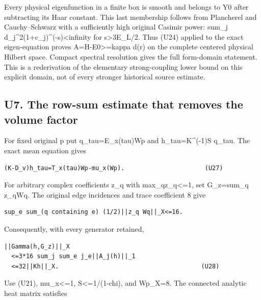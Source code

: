 \documentclass[11pt,a4paper]{article}
\renewcommand{\[}{\begingroup\small\originaldisplaystart}
\renewcommand{\]}{\originaldisplayend\endgroup}
\begin{document}
Every physical eigenfunction in a finite box is smooth and belongs to Y0
after subtracting its Haar constant. This last membership follows from
Plancherel and Cauchy--Schwarz with a sufficiently high original Casimir
power: sum\_j
{d\allowbreak{}\_\allowbreak{}j\allowbreak{}\textasciicircum{}\allowbreak{}2\allowbreak{}(\allowbreak{}1\allowbreak{}+\allowbreak{}c\allowbreak{}\_\allowbreak{}j\allowbreak{})\allowbreak{}\textasciicircum{}\allowbreak{}(\allowbreak{}-\allowbreak{}s\allowbreak{})\allowbreak{}\textless{}\allowbreak{}i\allowbreak{}n\allowbreak{}f\allowbreak{}i\allowbreak{}n\allowbreak{}i\allowbreak{}t\allowbreak{}y\allowbreak{}}
for s\textgreater3\textbar E\_L\textbar/2. Thus (U24) applied to the
exact eigen-equation proves A=H-E0\textgreater=kappa d(r) on the
complete centered physical Hilbert space. Compact spectral resolution
gives the full form-domain statement. This is a rederivation of the
elementary strong-coupling lower bound on this explicit domain, not of
every stronger historical source estimate.

\subsection{U7. The row-sum estimate that removes the volume
factor}\label{u7.-the-row-sum-estimate-that-removes-the-volume-factor}

For fixed original p put q\_tau=E\_x(tau)Wp and h\_tau=K\^{}(-1)S
q\_tau. The exact mean equation gives

\begin{verbatim}
(K-D_v)h_tau=T_x(tau)Wp-mu_x(Wp).                      (U27)
\end{verbatim}

For arbitrary complex coefficients z\_q with
max\_q\textbar z\_q\textbar\textless=1, set G\_z=sum\_q z\_qWq. The
original edge incidences and trace coefficient 8 give

\begin{verbatim}
sup_e sum_(q containing e) (1/2)||z_q Wq||_X<=16.
\end{verbatim}

Consequently, with every generator retained,

\begin{verbatim}
||Gamma(h,G_z)||_X
  <=3*16 sum_j sum_e j_e||A_j(h)||_1
  <=32||Kh||_X.                                       (U28)
\end{verbatim}

Use (U21), \textbar\textbar mu\_x\textbar\textbar\textless=1,
\textbar\textbar S\textbar\textbar\textless=1/(1-chi), and
\textbar\textbar Wp\textbar\textbar\_X=8. The connected analytic heat
matrix satisfies
\end{document}
